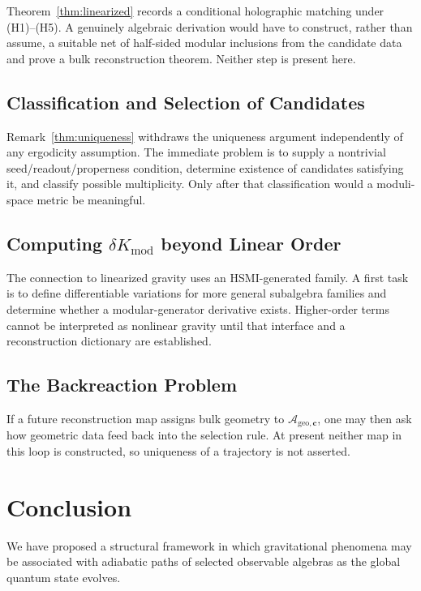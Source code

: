 \documentclass[12pt,a4paper]{article}
\begin{document}
Theorem~\ref{thm:linearized} records a conditional holographic matching under (H1)--(H5). A genuinely algebraic derivation would have to construct, rather than assume, a suitable net of half-sided modular inclusions from the candidate data and prove a bulk reconstruction theorem.  Neither step is present here.

\subsection{Classification and Selection of Candidates}

Remark~\ref{thm:uniqueness} withdraws the uniqueness argument independently of any ergodicity assumption.  The immediate problem is to supply a nontrivial seed/readout/properness condition, determine existence of candidates satisfying it, and classify possible multiplicity.  Only after that classification would a moduli-space metric be meaningful.

\subsection{Computing $\delta K_{\mathrm{mod}}$ beyond Linear Order}

The connection to linearized gravity uses an HSMI-generated family.  A first task is to define differentiable variations for more general subalgebra families and determine whether a modular-generator derivative exists.  Higher-order terms cannot be interpreted as nonlinear gravity until that interface and a reconstruction dictionary are established.

\subsection{The Backreaction Problem}

If a future reconstruction map assigns bulk geometry to $\mathcal{A}_{\mathrm{geo},\mathbf{c}}$, one may then ask how geometric data feed back into the selection rule.  At present neither map in this loop is constructed, so uniqueness of a trajectory is not asserted.

\section{Conclusion}
\label{sec:conclusion}

We have proposed a structural framework in which gravitational phenomena may be associated with adiabatic paths of selected observable algebras as the global quantum state evolves.
\end{document}
